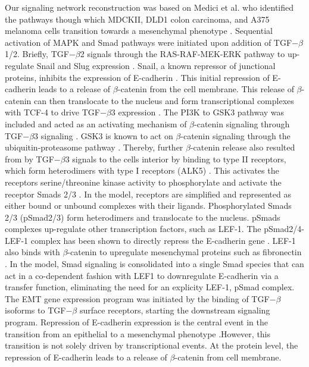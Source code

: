 \documentclass[12pt]{article}
\begin{document}
Our signaling network reconstruction was based on Medici et al. who identified the pathways though which MDCKII, DLD1 colon carcinoma,
and A375 melanoma cells transition towards a mesenchymal phenotype \citep{Medici:2008fk}.
Sequential activation of MAPK and Smad pathways were initiated upon addition of TGF$-\beta$1/2.  Briefly, TGF$-\beta$2 signals through the RAS-RAF-MEK-ERK pathway to up-regulate Snail and Slug expression \citep{Medici:2006qa}.  Snail, a known repressor of junctional proteins, inhibits the expression of E-cadherin \citep{Cano:2000kh}. This initial repression of E-cadherin leads to a release of $\beta$-catenin from the cell membrane. This release of $\beta$-catenin can then translocate to the nucleus and form transcriptional complexes with TCF-4 to drive TGF$-\beta$3 expression \citep{Medici:2008fk}. The PI3K to GSK3 pathway was included and acted as an activating mechanism of $\beta$-catenin signaling through TGF$-\beta$3 signaling \citep{Medici:2008fk}. GSK3 is known to act on $\beta$-catenin signaling through the ubiquitin-proteasome pathway \citep{Zhou:2004kx,Larue:2005vn}. Thereby, further $\beta$-catenin release also resulted from by TGF$-\beta$3 signals to the cells interior by binding to type II receptors, which form heterodimers with type I receptors (ALK5) \citep{Derynck:2003fc}. This activates the receptors serine/threonine kinase activity to phosphorylate and activate the receptor Smads 2/3 \citep{Massague:2005qc}. In the model, receptors are simplified and represented as either bound or unbound complexes with their ligands.
Phosphorylated Smads 2/3 (pSmad2/3) form heterodimers and translocate to the nucleus. pSmads complexes up-regulate other transcription factors, such as LEF-1. The pSmad2/4-LEF-1 complex has been shown to directly repress the E-cadherin gene \citep{Nawshad:2007kl}. LEF-1 also binds with $\beta$-catenin to upregulate mesenchymal proteins such as fibronectin \citep{Medici2011}.
In the model, Smad signaling is consolidated into a single Smad species that can act in a co-dependent fashion with LEF1 to downregulate E-cadherin via a transfer function, eliminating the need for an explicity LEF-1, pSmad complex.
The EMT gene expression program was initiated by the binding of TGF$-\beta$ isoforms to TGF$-\beta$ surface receptors, starting the downstream signaling program.
Repression of E-cadherin expression is the central event in the transition from an epithelial to a mesenchymal phenotype \citep{Cano:2000kh}.However, this transition is not solely driven by transcriptional events.
At the protein level, the repression of E-cadherin leads to a release of $\beta$-catenin from cell membrane.
\end{document}
